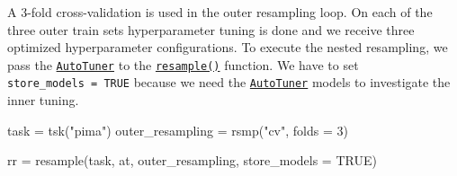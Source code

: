 \documentclass[
]{scrbook}
\newenvironment{Shaded}{\begin{snugshade}}{\end{snugshade}}
\newcommand{\AttributeTok}[1]{\textcolor[rgb]{0.77,0.63,0.00}{#1}}
\newcommand{\ConstantTok}[1]{\textcolor[rgb]{0.00,0.00,0.00}{#1}}
\newcommand{\DecValTok}[1]{\textcolor[rgb]{0.00,0.00,0.81}{#1}}
\newcommand{\FunctionTok}[1]{\textcolor[rgb]{0.00,0.00,0.00}{#1}}
\newcommand{\NormalTok}[1]{#1}
\newcommand{\OtherTok}[1]{\textcolor[rgb]{0.56,0.35,0.01}{#1}}
\newcommand{\StringTok}[1]{\textcolor[rgb]{0.31,0.60,0.02}{#1}}
\renewenvironment{Shaded} {\begin{snugshade}\small} {\end{snugshade}}
\begin{document}
A 3-fold cross-validation is used in the outer resampling loop.
On each of the three outer train sets hyperparameter tuning is done and we receive three optimized hyperparameter configurations.
To execute the nested resampling, we pass the \href{https://mlr3tuning.mlr-org.com/reference/AutoTuner.html}{\texttt{AutoTuner}} to the \href{https://mlr3.mlr-org.com/reference/resample.html}{\texttt{resample()}} function.
We have to set \texttt{store\_models\ =\ TRUE} because we need the \href{https://mlr3tuning.mlr-org.com/reference/AutoTuner.html}{\texttt{AutoTuner}} models to investigate the inner tuning.

\begin{Shaded}
\begin{Highlighting}[]
\NormalTok{task }\OtherTok{=} \FunctionTok{tsk}\NormalTok{(}\StringTok{"pima"}\NormalTok{)}
\NormalTok{outer\_resampling }\OtherTok{=} \FunctionTok{rsmp}\NormalTok{(}\StringTok{"cv"}\NormalTok{, }\AttributeTok{folds =} \DecValTok{3}\NormalTok{)}

\NormalTok{rr }\OtherTok{=} \FunctionTok{resample}\NormalTok{(task, at, outer\_resampling, }\AttributeTok{store\_models =} \ConstantTok{TRUE}\NormalTok{)}
\end{Highlighting}
\end{Shaded}
\end{document}
